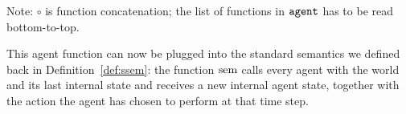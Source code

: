 \begin{definition}
	\noindent
	Note: $\circ$ is function concatenation; the list of functions in $\mathtt{agent}$ has to be read bottom-to-top.
\end{definition}

This agent function can now be plugged into the standard semantics we defined back in Definition~\ref{def:ssem}: the function $\mathrm{sem}$ calls every agent with the world and its last internal state and receives a new internal agent state, together with the action the agent has chosen to perform at that time step.







